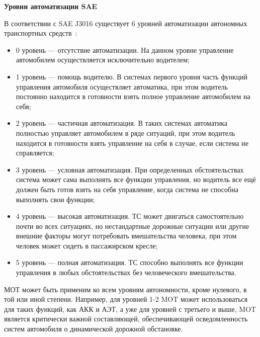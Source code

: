 \textbf{Уровни автоматизации SAE}

В соответствии с SAE J3016 существует 6 уровней автоматизации автономных транспортных средств~\cite{Steckhan2022}:

\begin{itemize}

	\item 	0 уровень --- отсутствие автоматизации. На данном уровне управление автомобилем осуществляется исключительно водителем;

	\item 	1 уровень --- помощь водителю. В системах первого уровня часть функций управления автомобиля осуществляет автоматика, при этом водитель постоянно находится в готовности взять полное управление автомобилем на себя;
	
	\item	2 уровень --- частичная автоматизация. В таких системах автоматика полностью управляет автомобилем в ряде ситуаций, при этом водитель находится в готовности взять управление на себя в случае, если система не справляется;
	
	\item	3 уровень --- условная автоматизация. При определенных обстоятельствах система может сама выполнять все функции управления, но водитель все ещё должен быть готов взять на себя управление, когда система не способна выполнять свои функции;
	
	\item 	4 уровень --- высокая автоматизация. ТС может двигаться самостоятельно почти во всех ситуациях, но нестандартные дорожные ситуации или другие внешние факторы могут потребовать вмешательства человека, при этом человек может сидеть в пассажирском кресле;
	
	\item 	5 уровень --- полная автоматизация. ТС способно выполнять все функции управления в любых обстоятельствах без человеческого вмешательства.

\end{itemize}

МОТ может быть применим ко всем уровням автономности, кроме нулевого, в той или иной степени. Например, для уровней 1-2 MOT может использоваться для таких функций, как АКК и АЭТ, а уже для уровней с третьего и выше, MOT является критически важной составляющей, обеспечивающей осведомленность систем автомобиля о динамической дорожной обстановке.